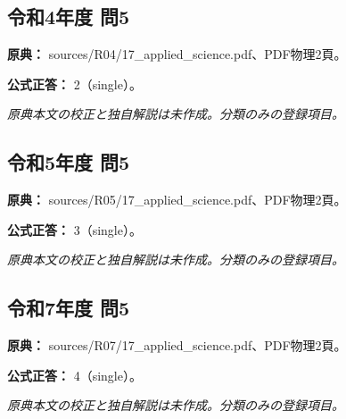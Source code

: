 \subsection{令和4年度 問5}
\label{q:r04-reg-applied-05}

\noindent\textbf{原典：} sources/R04/17\_applied\_science.pdf、PDF物理2頁。

\textbf{公式正答：} 2（single）。

\par\textit{原典本文の校正と独自解説は未作成。分類のみの登録項目。}

\subsection{令和5年度 問5}
\label{q:r05-reg-applied-05}

\noindent\textbf{原典：} sources/R05/17\_applied\_science.pdf、PDF物理2頁。

\textbf{公式正答：} 3（single）。

\par\textit{原典本文の校正と独自解説は未作成。分類のみの登録項目。}

\subsection{令和7年度 問5}
\label{q:r07-reg-applied-05}

\noindent\textbf{原典：} sources/R07/17\_applied\_science.pdf、PDF物理2頁。

\textbf{公式正答：} 4（single）。

\par\textit{原典本文の校正と独自解説は未作成。分類のみの登録項目。}

